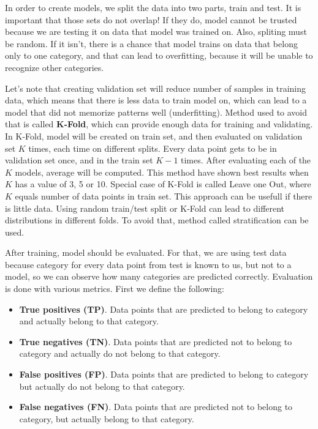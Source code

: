 \documentclass[a4paper]{article}
\begin{document}
In order to create models, we split the data into two parts, train and test. It is important that those sets do not overlap! If they do, model cannot be trusted because we are testing it on data that model was trained on. Also, spliting must be random. If it isn't, there is a chance that model trains on data that belong only to one category, and that can lead to overfitting, because it will be unable to recognize other categories. \cite{crossVal}

Let's note that creating validation set will reduce number of samples in training data, which means that there is less data to train model on, which can lead to a model that did not memorize patterns well (underfitting). Method used to avoid that is called \textbf{K-Fold}, which can provide enough data for training and validating. In K-Fold, model will be created on train set, and then evaluated on validation set $K$ times, each time on different splits. Every data point gets to be in validation set once, and in the train set $K-1$ times. After evaluating each of the $K$ models, average will be computed. This method have shown best results when $K$ has a value of 3, 5 or 10. Special case of K-Fold is called Leave one Out, where $K$ equals number of data points in train set. This approach can be usefull if there is little data. Using random train/test split or K-Fold can lead to different distributions in different folds. To avoid that, method called stratification can be used. \cite{crossVal}

After training, model should be evaluated. For that, we are using test data because category for every data point from test is known to us, but not to a model, so we can observe how many categories are predicted correctly. Evaluation is done with various metrics. First we define the following:

\begin{itemize}
	\item \textbf{True positives (TP)}. Data points that are predicted to belong to category and actually belong to that category.
	\item \textbf{True negatives (TN)}. Data points that are predicted not to belong to category and actually do not belong to that category.
	\item \textbf{False positives (FP)}. Data points that are predicted to belong to category but actually do not belong to that category. 
	\item \textbf{False negatives (FN)}. Data points that are predicted not to belong to category, but actually belong to that category.
\end{itemize}
\end{document}
